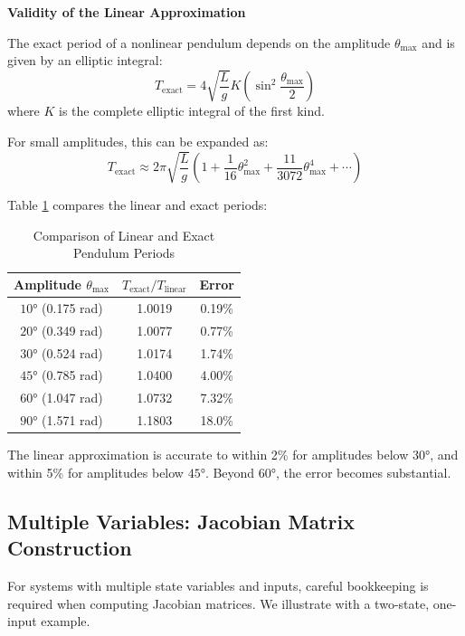 \textbf{Validity of the Linear Approximation}

The exact period of a nonlinear pendulum depends on the amplitude $\theta_{\max}$ and is given by an elliptic integral:
\begin{equation}
T_{\text{exact}} = 4\sqrt{\frac{L}{g}} K\left(\sin^2\frac{\theta_{\max}}{2}\right)
\end{equation}
where $K$ is the complete elliptic integral of the first kind.

For small amplitudes, this can be expanded as:
\begin{equation}
T_{\text{exact}} \approx 2\pi\sqrt{\frac{L}{g}} \left(1 + \frac{1}{16}\theta_{\max}^2 + \frac{11}{3072}\theta_{\max}^4 + \cdots\right)
\end{equation}

Table \ref{tab:pendulum_period} compares the linear and exact periods:

\begin{table}[htbp]
\centering
\caption{Comparison of Linear and Exact Pendulum Periods}
\label{tab:pendulum_period}
\begin{tabular}{@{}ccc@{}}
\toprule
Amplitude $\theta_{\max}$ & $T_{\text{exact}}/T_{\text{linear}}$ & Error \\
\midrule
$10°$ (0.175 rad) & 1.0019 & 0.19\% \\
$20°$ (0.349 rad) & 1.0077 & 0.77\% \\
$30°$ (0.524 rad) & 1.0174 & 1.74\% \\
$45°$ (0.785 rad) & 1.0400 & 4.00\% \\
$60°$ (1.047 rad) & 1.0732 & 7.32\% \\
$90°$ (1.571 rad) & 1.1803 & 18.0\% \\
\bottomrule
\end{tabular}
\end{table}

The linear approximation is accurate to within 2\% for amplitudes below $30°$, and within 5\% for amplitudes below $45°$. Beyond $60°$, the error becomes substantial.

\subsection{Multiple Variables: Jacobian Matrix Construction}

For systems with multiple state variables and inputs, careful bookkeeping is required when computing Jacobian matrices. We illustrate with a two-state, one-input example.

